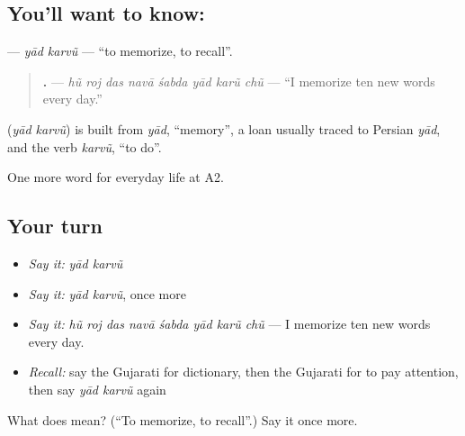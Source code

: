 \subsection*{You'll want to know:  }
\textbf{ } — \emph{yād karvũ} — \textquotedblleft{}to memorize, to recall\textquotedblright{}.

\begin{quote}
\textbf{       .} — \emph{hũ roj das navā śabda yād karũ chũ} — \textquotedblleft{}I memorize ten new words every day.\textquotedblright{}
\end{quote}

\begin{cousinweb}
\textbf{ } (\emph{yād karvũ}) is built from \emph{yād}, \textquotedblleft{}memory\textquotedblright{}, a loan usually traced to Persian \emph{yād}, and the verb \emph{karvũ}, \textquotedblleft{}to do\textquotedblright{}.
\end{cousinweb}

\begin{grammarlens}[title={What you've built}]
One more word for everyday life at A2.
\end{grammarlens}

\subsection*{Your turn}
\begin{itemize}
\raggedright
  \item \emph{Say it:} \emph{yād karvũ}
  \item \emph{Say it:} \emph{yād karvũ}, once more
  \item \emph{Say it:} \emph{hũ roj das navā śabda yād karũ chũ} — I memorize ten new words every day.
  \item \emph{Recall:} say the Gujarati for dictionary, then the Gujarati for to pay attention, then say \emph{yād karvũ} again
\end{itemize}

\begin{tcolorbox}[breakable,colback=teal!4,colframe=teal!35!black,title={Before you move on}]
What does   mean? (\textquotedblleft{}To memorize, to recall\textquotedblright{}.) Say it once more.
\end{tcolorbox}
